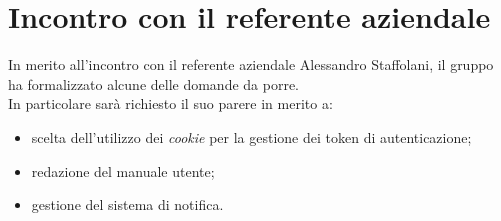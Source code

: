 \section{Incontro con il referente aziendale}
In merito all'incontro con il referente aziendale Alessandro Staffolani, il gruppo ha formalizzato alcune delle domande da porre.\\
In particolare sarà richiesto il suo parere in merito a:
\begin{itemize}
    \item scelta dell'utilizzo dei \textit{cookie} per la gestione dei token di autenticazione;
    \item redazione del manuale utente;
    \item gestione del sistema di notifica.
\end{itemize}